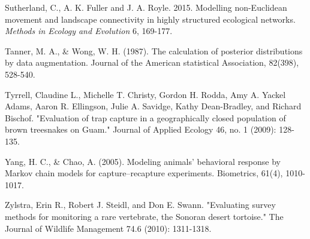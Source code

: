 \documentclass{book}
\begin{document}
\rf Sutherland, C., A. K. Fuller and J. A. Royle. 2015. Modelling
non-Euclidean movement and landscape connectivity in highly structured
ecological networks. {\it Methods in Ecology and Evolution}  6, 169-177.

\rf Tanner, M. A., \& Wong, W. H. (1987). The calculation of posterior
distributions by data augmentation. Journal of the American
statistical Association, 82(398), 528-540.

\rf Tyrrell, Claudine L., Michelle T. Christy, Gordon H. Rodda, Amy
A. Yackel Adams, Aaron R. Ellingson, Julie A. Savidge, Kathy
Dean-Bradley, and Richard Bischof. "Evaluation of trap capture in a
geographically closed population of brown treesnakes on Guam." Journal
of Applied Ecology 46, no. 1 (2009): 128-135.


\rf Yang, H. C., \& Chao, A. (2005). Modeling animals' behavioral response
by Markov chain models for capture–recapture experiments. Biometrics,
61(4), 1010-1017.

\rf Zylstra, Erin R., Robert J. Steidl, and Don E. Swann. "Evaluating
survey methods for monitoring a rare vertebrate, the Sonoran desert
tortoise." The Journal of Wildlife Management 74.6 (2010): 1311-1318.
\end{document}
